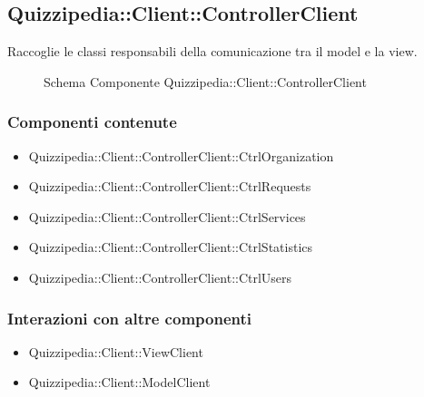 \subsection{Quizzipedia::Client::ControllerClient}
Raccoglie le classi responsabili della comunicazione tra il model e la view.
\begin{figure}[H]
\centering
\noindent{}
\caption[Quizzipedia::Client::ControllerClient]{Schema Componente Quizzipedia::Client::ControllerClient}
\end{figure}
\subsubsection{Componenti contenute}
\begin{itemize}
\item Quizzipedia::Client::ControllerClient::CtrlOrganization
\item Quizzipedia::Client::ControllerClient::CtrlRequests
\item Quizzipedia::Client::ControllerClient::CtrlServices
\item Quizzipedia::Client::ControllerClient::CtrlStatistics
\item Quizzipedia::Client::ControllerClient::CtrlUsers
\end{itemize}
\subsubsection{Interazioni con altre componenti}
\begin{itemize}
\item Quizzipedia::Client::ViewClient
\end{itemize}
\begin{itemize}
\item Quizzipedia::Client::ModelClient
\end{itemize}
